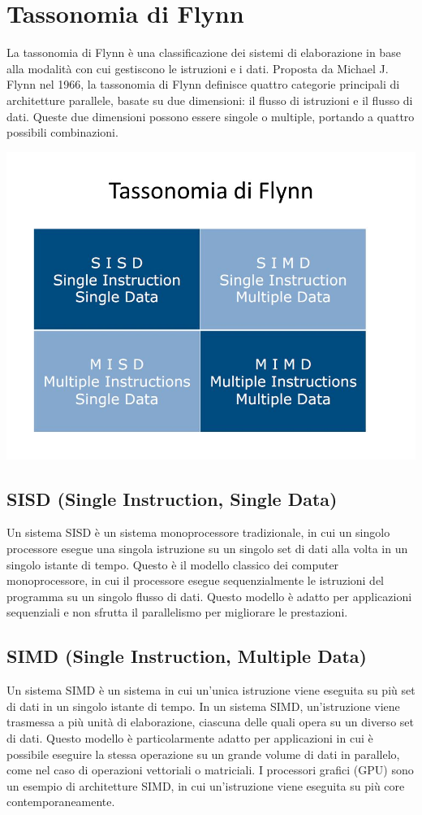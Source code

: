 \documentclass[12pt]{report}
\begin{document}
	\section{Tassonomia di Flynn}
	La tassonomia di Flynn è una classificazione dei sistemi di elaborazione in base alla modalità con cui gestiscono le istruzioni e i dati. Proposta da Michael J. Flynn nel 1966, la tassonomia di Flynn definisce quattro categorie principali di architetture parallele, basate su due dimensioni: il flusso di istruzioni e il flusso di dati. Queste due dimensioni possono essere singole o multiple, portando a quattro possibili combinazioni.

	\begin{center}
		\includegraphics[scale=0.30]{assets/flynn-taxonomy.jpg}
	\end{center}

	\subsection{SISD (Single Instruction, Single Data)}
	Un sistema SISD è un sistema monoprocessore tradizionale, in cui un singolo processore esegue una singola istruzione su un singolo set di dati alla volta in un singolo istante di tempo. Questo è il modello classico dei computer monoprocessore, in cui il processore esegue sequenzialmente le istruzioni del programma su un singolo flusso di dati. Questo modello è adatto per applicazioni sequenziali e non sfrutta il parallelismo per migliorare le prestazioni.

	\subsection{SIMD (Single Instruction, Multiple Data)}
	Un sistema SIMD è un sistema in cui un'unica istruzione viene eseguita su più set di dati in un singolo istante di tempo. In un sistema SIMD, un'istruzione viene trasmessa a più unità di elaborazione, ciascuna delle quali opera su un diverso set di dati. Questo modello è particolarmente adatto per applicazioni in cui è possibile eseguire la stessa operazione su un grande volume di dati in parallelo, come nel caso di operazioni vettoriali o matriciali. I processori grafici (GPU) sono un esempio di architetture SIMD, in cui un'istruzione viene eseguita su più core contemporaneamente.
\end{document}
